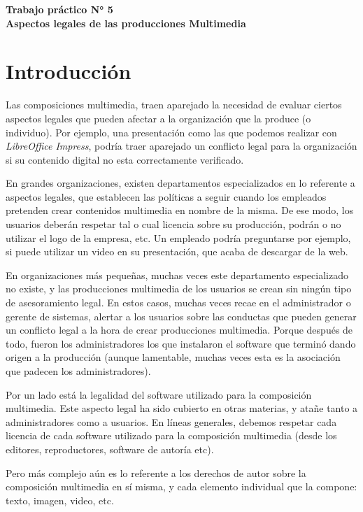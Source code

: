 \documentclass[12pt]{article}
\def\maketitle{

    \makeatletter
    {\color{bl} \centering \huge \sc \textbf{
    Trabajo práctico N° 5\\
    \large \vspace*{-8pt} \color{black} Aspectos legales de las producciones
    Multimedia
    \vspace*{8pt} }\par}
    \makeatother

    \makeatletter
    
}
\begin{document}
\thispagestyle{empty}
\maketitle
\setlength{\parindent}{0pt}

\section*{Introducción}

Las composiciones multimedia, traen aparejado la necesidad de evaluar ciertos
aspectos legales que pueden afectar a la organización que la produce (o
individuo). Por ejemplo, una presentación como las que podemos realizar con
\emph{LibreOffice Impress}, podría traer aparejado un conflicto legal para la
organización si su contenido digital no esta correctamente verificado.

En grandes organizaciones, existen departamentos especializados en lo
referente a aspectos legales, que establecen las políticas a seguir cuando los
empleados pretenden crear contenidos multimedia en nombre de la misma. De ese
modo, los usuarios deberán respetar tal o cual licencia sobre su producción,
podrán o no utilizar el logo de la empresa, etc. Un empleado podría
preguntarse por ejemplo, si puede utilizar un video en su presentación, que
acaba de descargar de la web.

En organizaciones más pequeñas, muchas veces este departamento especializado
no existe, y las producciones multimedia de los usuarios se crean sin ningún
tipo de asesoramiento legal. En estos casos, muchas veces recae en el
administrador o gerente de sistemas, alertar a los usuarios sobre las
conductas que pueden generar un conflicto legal a la hora de crear
producciones multimedia. Porque después de todo, fueron los administradores
los que instalaron el software que terminó dando origen a la producción
(aunque lamentable, muchas veces esta es la asociación que padecen los
administradores).

Por un lado está la legalidad del software utilizado para la composición
multimedia. Este aspecto legal ha sido cubierto en otras materias, y atañe
tanto a administradores como a usuarios. En líneas generales, debemos respetar
cada licencia de cada software utilizado para la composición multimedia (desde
los editores, reproductores, software de autoría etc).

Pero más complejo aún es lo referente a los derechos de autor sobre la
composición multimedia en sí misma, y cada elemento individual que la compone:
texto, imagen, video, etc.
\end{document}
